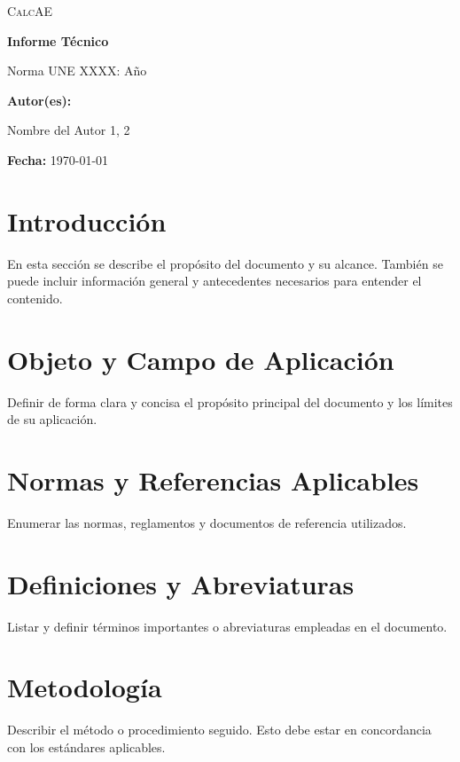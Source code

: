 \documentclass[a4paper,12pt]{article}
\let\OldTextField\TextField
\renewcommand{\TextField}[2][]{%
  \raisebox{-0.1ex}{\OldTextField[height=.95em,  bordercolor={1 1 1}, backgroundcolor={1 1 1},#1]{#2}}%
}
\begin{document}
\begin{Form}




\begin{titlepage}
    \centering
    {\scshape\LARGE CalcAE \par}
    \vspace{1cm}
    {\Huge\bfseries Informe Técnico\par}
    \vspace{2cm}
    {\Large Norma UNE XXXX: Año \par}
    \vspace{1cm}
    \vfill
    \textbf{Autor(es):}\par
    Nombre del Autor 1,\TextField[name=Tecnico,width=4cm,default=Juan Pérez]{} 2\par
    \vspace{0.5cm}
    \textbf{Fecha:} \today \par
\end{titlepage}

\tableofcontents
\newpage

\section{Introducción}
En esta sección se describe el propósito del documento y su alcance. También se puede incluir información general y antecedentes necesarios para entender el contenido.

\section{Objeto y Campo de Aplicación}
Definir de forma clara y concisa el propósito principal del documento y los límites de su aplicación.

\section{Normas y Referencias Aplicables}
Enumerar las normas, reglamentos y documentos de referencia utilizados.

\section{Definiciones y Abreviaturas}
Listar y definir términos importantes o abreviaturas empleadas en el documento.

\section{Metodología}
Describir el método o procedimiento seguido. Esto debe estar en concordancia con los estándares aplicables.


\end{Form}
\end{document}
